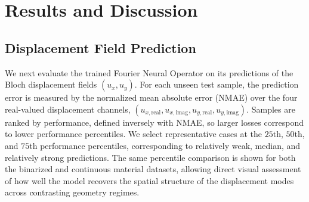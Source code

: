 \documentclass[preprint,review,12pt,numafflabel]{elsarticle}
\begin{document}
\section{Results and Discussion}


\subsection{Displacement Field Prediction}
We next evaluate the trained Fourier Neural Operator on its predictions of the Bloch displacement fields $(u_x,u_y)$. For each unseen test sample, the prediction error is measured by the normalized mean absolute error (NMAE) over the four real-valued displacement channels, $(u_{x,\mathrm{real}},u_{x,\mathrm{imag}},u_{y,\mathrm{real}},u_{y,\mathrm{imag}})$. Samples are ranked by performance, defined inversely with NMAE, so larger losses correspond to lower performance percentiles. We select representative cases at the $25$th, $50$th, and $75$th performance percentiles, corresponding to relatively weak, median, and relatively strong predictions. The same percentile comparison is shown for both the binarized and continuous material datasets, allowing direct visual assessment of how well the model recovers the spatial structure of the displacement modes across contrasting geometry regimes.
\end{document}
